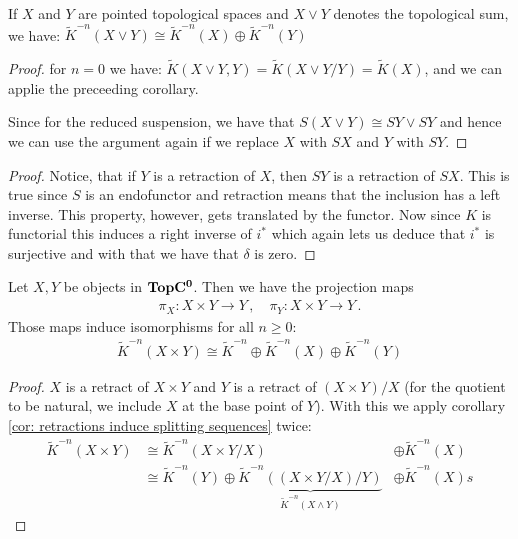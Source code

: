 \begin{theorem}[Additivity]
	If $X$ and $Y$ are pointed topological spaces and $X\vee Y$ denotes the topological sum, we have:
	$\tilde{K}^{-n}(X\vee Y)\cong \tilde{K}^{-n}(X)\oplus \tilde{K}^{-n}(Y)$
\end{theorem}
\begin{proof}
	for $n=0$ we have: 
	$\tilde{K}(X\vee Y,Y)=\tilde{K}(X\vee Y\slash Y)=\tilde{K}(X)$, and we can applie the preceeding corollary.
	
	Since for the reduced suspension, we have that $S(X\vee Y)\cong SY\vee SY$ and hence we can use the argument again if we replace $X$ with $SX$ and $Y$ with $SY$.
\end{proof}
\begin{proof}
	Notice, that if $Y$ is a retraction of $X$, then $SY$ is a retraction of $SX$. This is true since $S$ is an endofunctor and retraction means that the inclusion has a left inverse. This property, however, gets translated by the functor. Now since $K$ is functorial this induces a right inverse of $i^*$ which again lets us deduce that $i^*$ is surjective and with that we have that $\delta$ is zero.   
\end{proof}
\begin{cor}
	Let $X,Y$ be objects in $\operatorname{\mathbf{TopC^0}}$. Then we have the projection maps 
	\begin{align*}
		\pi_X:X\times Y\to Y \, , \quad \pi_Y:X\times Y\to Y\, .
	\end{align*} Those maps induce isomorphisms for all $n\geq0:$
	\begin{align*}
		\tilde{K}^{-n}(X\times Y)\cong \tilde{K}^{-n}\oplus \tilde{K}^{-n}(X)\oplus \tilde{K}^{-n}(Y)
	\end{align*}
\end{cor}
\begin{proof}
	$X$ is a retract of $X\times Y$ and $Y$ is a retract of $(X\times Y)\slash X$ (for the quotient to be natural, we include $X$ at the base point of $Y$). With this we apply corollary \ref{cor: retractions induce splitting sequences} twice:
	\begin{equation*}
		\begin{array}{lll}
			\tilde{K}^{-n}(X\times Y)&\cong \tilde{K}^{-n}(X\times Y \slash X) & \oplus \tilde{K}^{-n}(X) \\
			&\cong \tilde{K}^{-n}(Y) \oplus \underbrace{\tilde{K}^{-n}((X\times Y \slash X )\slash Y)}_{\tilde{K}^{-n}(X\wedge Y)}&\oplus\tilde{K}^{-n}(X)  
			s    \end{array}
	\end{equation*}
\end{proof}

